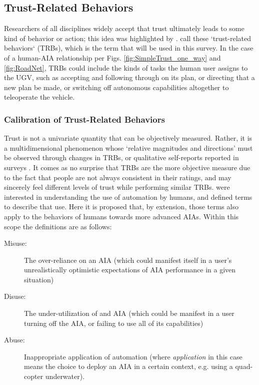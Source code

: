 \subsection{Trust-Related Behaviors} \label{sec:trbs}
Researchers of all disciplines widely accept that trust ultimately leads to some kind of behavior or action; this idea was highlighted by \citet{Lewis1985-pr}.  \citet{McKnight2001-fa} call these `trust-related behaviors` (TRBs), which is the term that will be used in this survey. In the case of a human-AIA relationship per Figs. \ref{fig:SimpleTrust_one_way} and \ref{fig:RoadNet}, TRBs could include the kinds of tasks the human user assigns to the UGV, such as accepting and following through on its plan, or directing that a new plan be made, or switching off autonomous capabilities altogether to teleoperate the vehicle.

\subsubsection{Calibration of Trust-Related Behaviors}
    Trust is not a univariate quantity that can be objectively measured. Rather, it is a multidimensional phenomenon whose `relative magnitudes and directions' must be observed through changes in TRBs, or qualitative self-reports reported in surveys \cite{Muir1996-gt}. It comes as no surprise that TRBs are the more objective measure due to the fact that people are not always consistent in their ratings, and may sincerely feel different levels of trust while performing similar TRBs. \citet{Parasuraman1997-co} were interested in understanding the use of automation by humans, and defined terms to describe that use. Here it is proposed that, by extension, those terms also apply to the behaviors of humans towards more advanced AIAs. Within this scope the definitions are as follows:
    
    \begin{description}
        \item [Misuse:] The over-reliance on an AIA (which could manifest itself in a user's unrealistically optimistic expectations of AIA performance in a given situation)
        \item [Disuse:] The under-utilization of and AIA (which could be manifest in a user turning off the AIA, or failing to use all of its capabilities)
        \item [Abuse:] Inappropriate application of automation (where \emph{application} in this case means the choice to deploy an AIA in a certain context, e.g. using a quad-copter underwater).
    \end{description}

